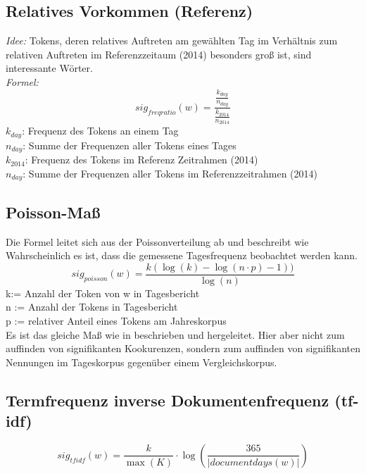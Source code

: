 \subsection{Relatives Vorkommen (Referenz)}
\emph{Idee: } Tokens, deren relatives Auftreten am gewählten Tag im Verhältnis zum relativen Auftreten im Referenzzeitaum (2014) besonders groß ist, sind interessante Wörter.\\ 
	\emph{Formel: } 
	\begin{equation}
	sig_{freqratio}(w) = \frac{\frac{k_{day}}{n_{day}}}{\frac{k_{2014}}{n_{2014}}}
	\end{equation}
	$k_{day}$: Frequenz des Tokens an einem Tag\\
	$n_{day}$: Summe der Frequenzen aller Tokens eines Tages\\
	$k_{2014}$: Frequenz des Tokens im Referenz Zeitrahmen (2014)\\
	$n_{day}$: Summe der Frequenzen aller Tokens im Referenzzeitrahmen (2014)\\
\subsection{Poisson-Maß}

Die Formel leitet sich aus der Poissonverteilung ab und beschreibt wie Wahrscheinlich es ist, dass die gemessene Tagesfrequenz beobachtet werden kann. 
\begin{equation}
sig_{poisson}(w) = \frac{k(\log(k)-\log(n\cdot p) -1 ))}{\log(n)}
\end{equation}
k:= Anzahl der Token von w in Tagesbericht\\
n := Anzahl der Tokens in Tagesbericht\\
p := relativer Anteil eines Tokens am Jahreskorpus\\
Es ist das gleiche Maß wie in \cite[S. 338-340]{heyer06} beschrieben und hergeleitet. Hier aber nicht zum auffinden von signifikanten Kookurenzen, sondern zum auffinden von signifikanten Nennungen im Tageskorpus gegenüber einem Vergleichskorpus.\\

\subsection{Termfrequenz inverse Dokumentenfrequenz (tf-idf)}
 \begin{equation}
sig_{tf idf}(w) = \frac{k}{\max(K)} \cdot \log ( \frac{365}{|documentdays(w)|})
\end{equation}

